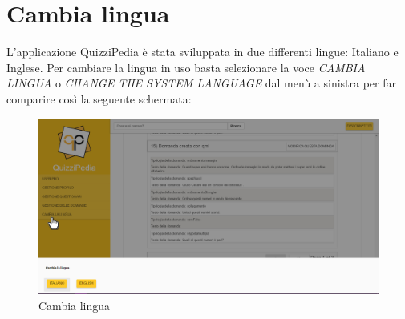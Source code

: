 \newpage
\section{Cambia lingua}
L'applicazione QuizziPedia è stata sviluppata in due differenti lingue: Italiano e Inglese. Per cambiare la lingua in uso basta selezionare la voce \textit{CAMBIA LINGUA} o \textit{CHANGE THE SYSTEM LANGUAGE} dal menù a sinistra per far comparire così la seguente schermata:

 \label{CambiaLingua}
 \begin{figure}[ht]
 	\centering
 	\includegraphics[scale=0.33]{img/cambia_lingua.png}
 	\caption{Cambia lingua}
 \end{figure}
 \FloatBarrier
